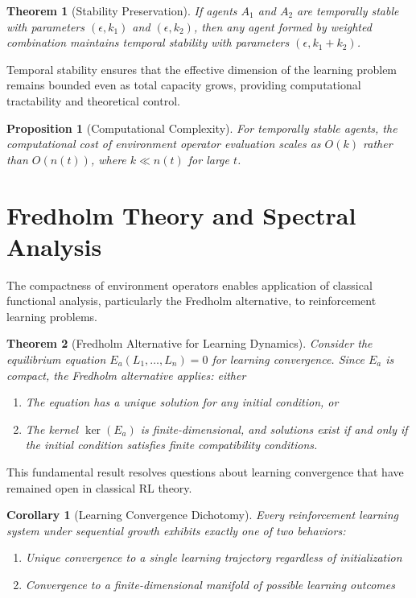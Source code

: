 \documentclass[11pt]{article}
\newtheorem{theorem}{Theorem}
\newtheorem{proposition}{Proposition}
\newtheorem{corollary}{Corollary}
\begin{document}
\begin{theorem}[Stability Preservation]
If agents $A_1$ and $A_2$ are temporally stable with parameters $(\epsilon, k_1)$ and $(\epsilon, k_2)$, then any agent formed by weighted combination maintains temporal stability with parameters $(\epsilon, k_1 + k_2)$.
\end{theorem}

Temporal stability ensures that the effective dimension of the learning problem remains bounded even as total capacity grows, providing computational tractability and theoretical control.

\begin{proposition}[Computational Complexity]
For temporally stable agents, the computational cost of environment operator evaluation scales as $O(k)$ rather than $O(n(t))$, where $k \ll n(t)$ for large $t$.
\end{proposition}

\section{Fredholm Theory and Spectral Analysis}

The compactness of environment operators enables application of classical functional analysis, particularly the Fredholm alternative, to reinforcement learning problems.

\begin{theorem}[Fredholm Alternative for Learning Dynamics]
Consider the equilibrium equation $E_a(L_1, \ldots, L_n) = 0$ for learning convergence. Since $E_a$ is compact, the Fredholm alternative applies: either
\begin{enumerate}
\item The equation has a unique solution for any initial condition, or
\item The kernel $\ker(E_a)$ is finite-dimensional, and solutions exist if and only if the initial condition satisfies finite compatibility conditions.
\end{enumerate}
\end{theorem}

This fundamental result resolves questions about learning convergence that have remained open in classical RL theory.

\begin{corollary}[Learning Convergence Dichotomy]
Every reinforcement learning system under sequential growth exhibits exactly one of two behaviors:
\begin{enumerate}
\item Unique convergence to a single learning trajectory regardless of initialization
\item Convergence to a finite-dimensional manifold of possible learning outcomes
\end{enumerate}
\end{corollary}
\end{document}
